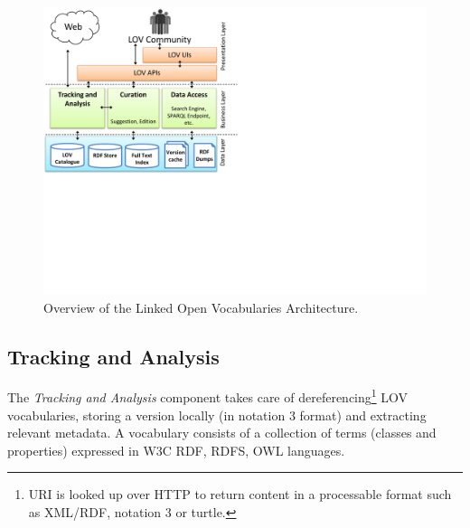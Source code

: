 \documentclass{iosart2c}
\begin{document}

\begin{figure}[ht!b]
\includegraphics[trim={0cm 8cm 0cm 0cm},scale=.6]{lov_architecture.pdf}
\caption{Overview of the Linked Open Vocabularies Architecture.}
\label{fig:arch}
\end{figure}

\subsection{Tracking and Analysis}
	The \emph{Tracking and Analysis} component takes care of dereferencing\footnote{URI is looked up over HTTP to return content in a processable format such as XML/RDF, notation 3 or turtle.} LOV vocabularies, storing a version locally (in notation 3 format) and extracting relevant metadata. A vocabulary consists of a collection of terms (classes and properties) expressed in W3C RDF, RDFS, OWL languages. 
\end{document}
